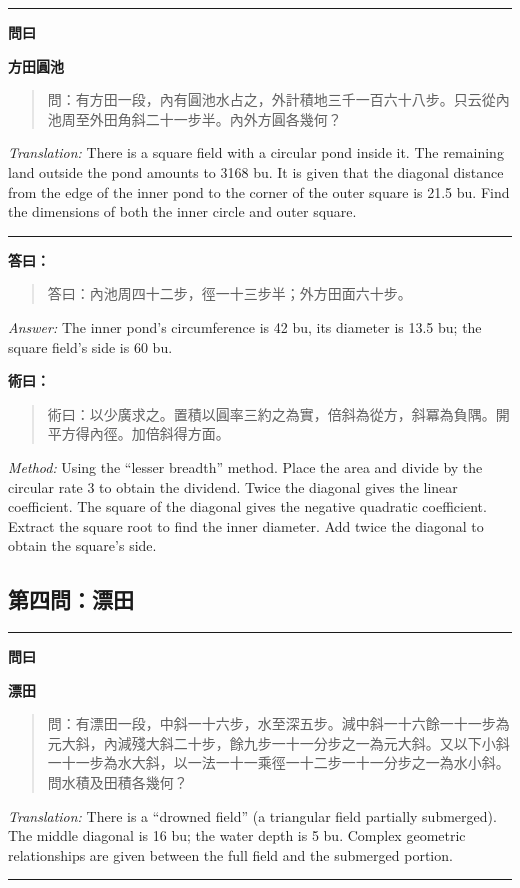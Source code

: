 \documentclass[11pt,a4paper]{article}
\newenvironment{problem}[1][]{%
  \medskip\noindent\rule{\textwidth}{0.4pt}%
  \par\noindent\textbf{\color{sectioncolor}#1}\par\nopagebreak%
  \smallskip%
}{%
  \par\noindent\rule{\textwidth}{0.4pt}\medskip%
}
\newenvironment{answer}{%
  \medskip\noindent{\color{answercolor}\rule{0.5\textwidth}{0.5pt}}%
  \par\color{answercolor}%
}{%
  \par\medskip%
}
\newenvironment{method}{%
  \medskip\noindent{\color{methodcolor}\rule{0.5\textwidth}{0.5pt}}%
  \par\color{methodcolor}%
}{%
  \par\medskip%
}
\begin{document}
\begin{problem}[\textbf{問曰}]
\textbf{\color{sectioncolor}方田圓池}

\begin{quote}
\textcolor{chinacolor}{%
問：有方田一段，內有圓池水占之，外計積地三千一百六十八步。只云從內池周至外田角斜二十一步半。內外方圓各幾何？
}
\end{quote}

\textit{Translation:} There is a square field with a circular pond inside 
it. The remaining land outside the pond amounts to 3168 bu. It is given 
that the diagonal distance from the edge of the inner pond to the corner 
of the outer square is 21.5 bu. Find the dimensions of both the inner 
circle and outer square.
\end{problem}

\begin{answer}
\textbf{答曰：}

\begin{quote}
\textcolor{chinacolor}{%
答曰：內池周四十二步，徑一十三步半；外方田面六十步。
}
\end{quote}

\textit{Answer:} The inner pond's circumference is 42 bu, its diameter is 
13.5 bu; the square field's side is 60 bu.
\end{answer}

\begin{method}
\textbf{術曰：}

\begin{quote}
\textcolor{chinacolor}{%
術曰：以少廣求之。置積以圓率三約之為實，倍斜為從方，斜冪為負隅。開平方得內徑。加倍斜得方面。
}
\end{quote}

\textit{Method:} Using the ``lesser breadth'' method. Place the area and 
divide by the circular rate 3 to obtain the dividend. Twice the diagonal 
gives the linear coefficient. The square of the diagonal gives the 
negative quadratic coefficient. Extract the square root to find the inner 
diameter. Add twice the diagonal to obtain the square's side.
\end{method}

\subsection*{第四問：漂田}

\begin{problem}[\textbf{問曰}]
\textbf{\color{sectioncolor}漂田}

\begin{quote}
\textcolor{chinacolor}{%
問：有漂田一段，中斜一十六步，水至深五步。減中斜一十六餘一十一步為元大斜，內減殘大斜二十步，餘九步一十一分步之一為元大斜。又以下小斜一十一步為水大斜，以一法一十一乘徑一十二步一十一分步之一為水小斜。問水積及田積各幾何？
}
\end{quote}

\textit{Translation:} There is a ``drowned field'' (a triangular field 
partially submerged). The middle diagonal is 16 bu; the water depth is 
5 bu. Complex geometric relationships are given between the full field 
and the submerged portion.
\end{problem}
\end{document}
